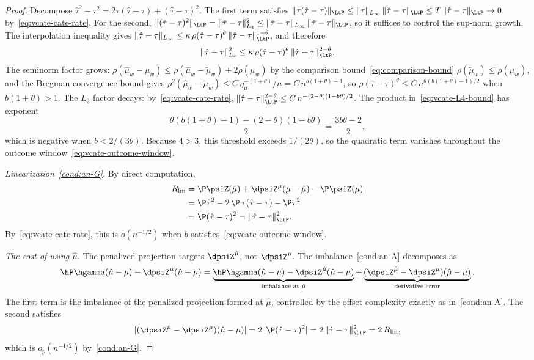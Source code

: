 \documentclass{article}
\begin{document}
\begin{proof}
Decompose
$\hat\tau^2 - \tau^2
  = 2\tau(\hat\tau - \tau)
  + (\hat\tau - \tau)^2$.
The first term satisfies
$\|\tau(\hat\tau - \tau)\|_{\LtP}
  \le \|\tau\|_{L_\infty}\,
      \|\hat\tau - \tau\|_{\LtP}
  \le T\,\|\hat\tau - \tau\|_{\LtP}
  \to 0$
by~\eqref{eq:vcate-cate-rate}.
For the second,
$\|(\hat\tau - \tau)^2\|_{\LtP}
  = \|\hat\tau - \tau\|_{L_4}^2
  \le \|\hat\tau - \tau\|_{L_\infty}\,
      \|\hat\tau - \tau\|_{\LtP}$,
so it suffices to control
the sup-norm growth.
The interpolation inequality gives
$\|\hat\tau - \tau\|_{L_\infty}
  \le \kappa\,
      \rho(\hat\tau - \tau)^\theta\,
      \|\hat\tau - \tau\|_{\LtP}^{1-\theta}$,
and therefore
\begin{equation}\label{eq:vcate-L4-bound}
\|\hat\tau - \tau\|_{L_4}^2
  \le \kappa\,
      \rho(\hat\tau - \tau)^\theta\,
      \|\hat\tau - \tau\|_{\LtP}^{2-\theta}.
\end{equation}
The seminorm factor grows:
$\rho(\hat\mu_w - \mu_w)
  \le \rho(\hat\mu_w - \tilde\mu_w)
    + 2\rho(\mu_w)$
by the comparison bound~\eqref{eq:comparison-bound}
$\rho(\tilde\mu_w) \le \rho(\mu_w)$,
and the Bregman convergence bound gives
$\rho^2(\hat\mu_w - \tilde\mu_w)
  \le C\,\eta_\mu^{-(1+\theta)}/n
  = C\, n^{b(1+\theta) - 1}$,
so $\rho(\hat\tau - \tau)^\theta
  \le C\, n^{\theta(b(1+\theta)-1)/2}$
when $b(1+\theta) > 1$.
The $L_2$ factor decays:
by~\eqref{eq:vcate-cate-rate},
$\|\hat\tau - \tau\|_{\LtP}^{2-\theta}
  \le C\, n^{-(2-\theta)(1-b\theta)/2}$.
The product in~\eqref{eq:vcate-L4-bound}
has exponent
\[
\frac{\theta(b(1+\theta) - 1)
  - (2-\theta)(1-b\theta)}{2}
  = \frac{3b\theta - 2}{2},
\]
which is negative
when $b < 2/(3\theta)$.
Because $4 > 3$,
this threshold exceeds $1/(2\theta)$,
so the quadratic term vanishes
throughout the outcome window~\eqref{eq:vcate-outcome-window}.

\emph{Linearization~\ref{cond:an-G}.}
By direct computation,
\begin{align*}
R_{\mathrm{lin}}
&= \P\psiZ(\hat\mu) + \dpsiZ^\mu(\mu - \hat\mu) - \P\psiZ(\mu) \\
&= \P\hat\tau^2
  - 2\,\P\,\tau(\hat\tau - \tau)
  - \P\tau^2 \\
&= \P(\hat\tau - \tau)^2
  = \|\hat\tau - \tau\|_{\LtP}^2.
\end{align*}
By~\eqref{eq:vcate-cate-rate},
this is $o(n^{-1/2})$
when $b$ satisfies~\eqref{eq:vcate-outcome-window}.

\emph{The cost of using $\hat\mu$.}
The penalized projection targets
$\dpsiZ^{\hat\mu}$, not $\dpsiZ^\mu$.
The imbalance~\ref{cond:an-A} decomposes as
\[
\hP\hgamma(\hat\mu - \mu) - \dpsiZ^\mu(\hat\mu - \mu)
  = \underbrace{\hP\hgamma(\hat\mu - \mu)
    - \dpsiZ^{\hat\mu}(\hat\mu - \mu)}_{\text{imbalance at }\hat\mu}
  + \underbrace{(\dpsiZ^{\hat\mu} - \dpsiZ^\mu)
    (\hat\mu - \mu)}_{\text{derivative error}}.
\]
The first term is the imbalance
of the penalized projection
formed at $\hat\mu$,
controlled by the offset complexity
exactly as in~\ref{cond:an-A}.
The second satisfies
\[
|(\dpsiZ^{\hat\mu} - \dpsiZ^\mu)(\hat\mu - \mu)|
  = 2\,|\P(\hat\tau - \tau)^2|
  = 2\,\|\hat\tau - \tau\|_{\LtP}^2
  = 2\, R_{\mathrm{lin}},
\]
which is $o_p(n^{-1/2})$ by~\ref{cond:an-G}.


\end{proof}
\end{document}
